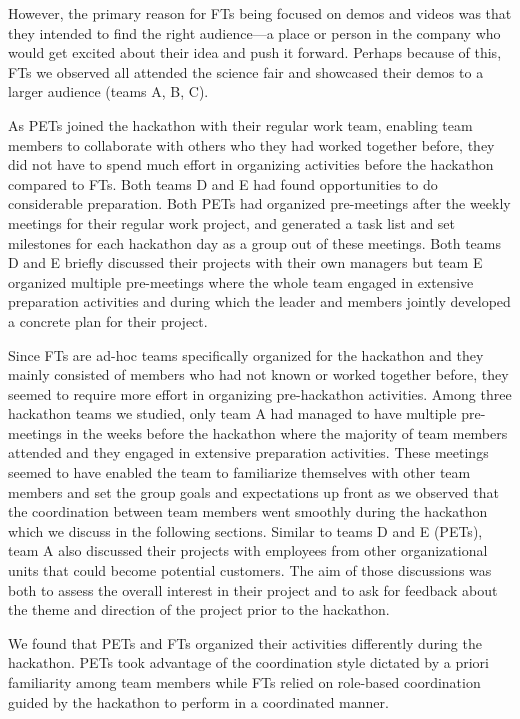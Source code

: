 \documentclass{hcij}
\begin{document}
However, the primary reason for FTs being focused on demos and videos was that they intended to find the right audience—a place or person in the company who would get excited about their idea and push it forward. Perhaps because of this, FTs we observed all attended the science fair and showcased their demos to a larger audience (teams A, B, C).

As PETs joined the hackathon with their regular work team, enabling team members to collaborate with others who they had worked together before, they did not have to spend much effort in organizing activities before the hackathon compared to FTs. Both teams D and E had found opportunities to do considerable preparation. Both PETs had organized pre-meetings after the weekly meetings for their regular work project, and generated a task list and set milestones for each hackathon day as a group out of these meetings. Both teams D and E briefly discussed their projects with their own managers but team E organized multiple pre-meetings where the whole team engaged in extensive preparation activities and during which the leader and members jointly developed a concrete plan for their project.

Since FTs are ad-hoc teams specifically organized for the hackathon and they mainly consisted of members who had not known or worked together before, they seemed to require more effort in organizing pre-hackathon activities. Among three hackathon teams we studied, only team A had managed to have multiple pre-meetings in the weeks before the hackathon where the majority of team members attended and they engaged in extensive preparation activities. These meetings seemed to have enabled the team to familiarize themselves with other team members and set the group goals and expectations up front as we observed that the coordination between team members went smoothly during the hackathon which we discuss in the following sections.  Similar to teams D and E (PETs), team A also discussed their projects with employees from other organizational units that could become potential customers. The aim of those discussions was both to assess the overall interest in their project and to ask for feedback about the theme and direction of the project prior to the hackathon.

We found that PETs and FTs organized their activities differently during the hackathon. PETs took advantage of the coordination style dictated by a priori familiarity among team members while FTs relied on role-based coordination guided by the hackathon to perform in a coordinated manner.
\end{document}
